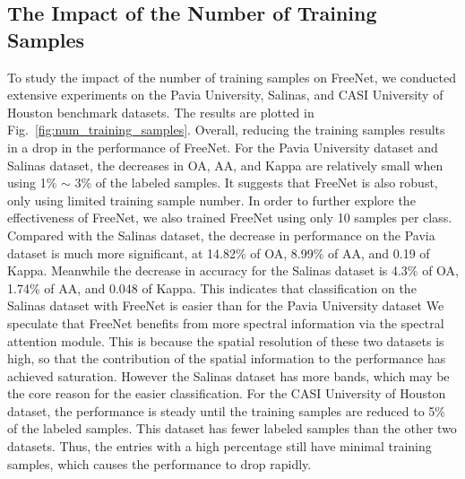 \documentclass[journal]{IEEEtran}
\begin{document}
\subsection{\textbf{The Impact of the Number of Training Samples}}
To study the impact of the number of training samples on FreeNet, we conducted extensive experiments on the Pavia University, Salinas, and CASI University of Houston benchmark datasets.
The results are plotted in Fig.~\ref{fig:num_training_samples}.
Overall, reducing the training samples results in a drop in the performance of FreeNet. 
For the Pavia University dataset and Salinas dataset, the decreases in OA, AA, and Kappa are relatively small when using 1\% $\sim$ 3\% of the labeled samples.
It suggests that FreeNet is also robust, only using limited training sample number.
In order to further explore the effectiveness of FreeNet, we also trained FreeNet using only 10 samples per class. 
Compared with the Salinas dataset, the decrease in performance on the Pavia dataset is much more significant, at 14.82\% of OA, 8.99\% of AA, and 0.19 of Kappa. 
Meanwhile the decrease in accuracy for the Salinas dataset is 4.3\% of OA, 1.74\% of AA, and 0.048 of Kappa. 
This indicates that classification on the Salinas dataset with FreeNet is easier than for the Pavia University dataset 
We speculate that FreeNet benefits from more spectral information via the spectral attention module. 
This is because the spatial resolution of these two datasets is high, so that the contribution of the spatial information to the performance has achieved saturation. 
However the Salinas dataset has more bands, which may be the core reason for the easier classification. For the CASI University of Houston dataset, the performance is steady until the training samples are reduced to 5\% of the labeled samples. 
This dataset has fewer labeled samples than the other two datasets. 
Thus, the entries with a high percentage still have minimal training samples, which causes the performance to drop rapidly.
\end{document}
